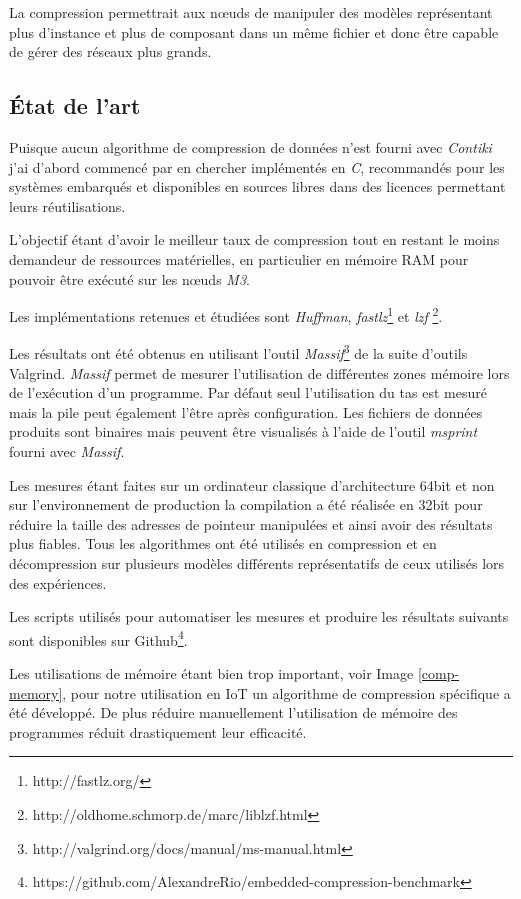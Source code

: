 La compression permettrait aux nœuds de manipuler des modèles représentant plus d'instance et plus de composant dans un même fichier et donc être capable de gérer des réseaux plus grands.

\subsection{État de l'art}

Puisque aucun algorithme de compression de données n'est fourni avec \emph{Contiki} j'ai d'abord commencé par en chercher implémentés en \emph{C}, recommandés pour les systèmes embarqués et disponibles en sources libres dans des licences permettant leurs réutilisations.

L'objectif étant d'avoir le meilleur taux de compression tout en restant le moins demandeur de ressources matérielles, en particulier en mémoire RAM pour pouvoir être exécuté sur les nœuds \emph{M3}.

Les implémentations retenues et étudiées sont \emph{Huffman}, \emph{fastlz}\footnote{http://fastlz.org/} et \emph{lzf} \footnote{http://oldhome.schmorp.de/marc/liblzf.html}.

Les résultats ont été obtenus en utilisant l'outil \emph{Massif}\footnote{http://valgrind.org/docs/manual/ms-manual.html} de la suite d'outils Valgrind. \emph{Massif} permet de mesurer l'utilisation de différentes zones mémoire lors de l'exécution d'un programme. Par défaut seul l'utilisation du tas est mesuré mais la pile peut également l'être après configuration. Les fichiers de données produits sont binaires mais peuvent être visualisés à l'aide de l'outil \emph{msprint} fourni avec \emph{Massif}.

Les mesures étant faites sur un ordinateur classique d'architecture 64bit et non sur l'environnement de production la compilation a été réalisée en 32bit pour réduire la taille des adresses de pointeur manipulées et ainsi avoir des résultats plus fiables. Tous les algorithmes ont été utilisés en compression et en décompression sur plusieurs modèles différents représentatifs de ceux utilisés lors des expériences.

Les scripts utilisés pour automatiser les mesures et produire les résultats suivants sont disponibles sur Github\footnote{https://github.com/AlexandreRio/embedded-compression-benchmark}.

Les utilisations de mémoire étant bien trop important, voir Image \ref{comp-memory}, pour notre utilisation en IoT un algorithme de compression spécifique a été développé. De plus réduire manuellement l'utilisation de mémoire des programmes réduit drastiquement leur efficacité.

